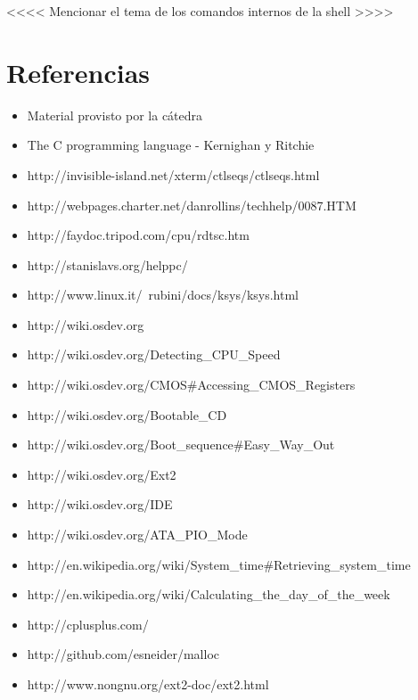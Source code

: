 \documentclass[a4paper,10pt]{article}
\begin{document}
<<<< Mencionar el tema de los comandos internos de la shell >>>>

\newpage     
\section{Referencias}

\begin{itemize}
  \item Material provisto por la cátedra
  \item The C programming language - Kernighan y Ritchie
  \item http://invisible-island.net/xterm/ctlseqs/ctlseqs.html
  \item http://webpages.charter.net/danrollins/techhelp/0087.HTM
  \item http://faydoc.tripod.com/cpu/rdtsc.htm
  \item http://stanislavs.org/helppc/
  \item http://www.linux.it/~rubini/docs/ksys/ksys.html
  \item http://wiki.osdev.org
  \item http://wiki.osdev.org/Detecting\_CPU\_Speed
  \item	http://wiki.osdev.org/CMOS\#Accessing\_CMOS\_Registers
  \item http://wiki.osdev.org/Bootable\_CD
  \item http://wiki.osdev.org/Boot\_sequence\#Easy\_Way\_Out
  \item http://wiki.osdev.org/Ext2
  \item http://wiki.osdev.org/IDE
  \item http://wiki.osdev.org/ATA\_PIO\_Mode
  \item http://en.wikipedia.org/wiki/System\_time\#Retrieving\_system\_time
  \item http://en.wikipedia.org/wiki/Calculating\_the\_day\_of\_the\_week
  \item http://cplusplus.com/
  \item http://github.com/esneider/malloc
  \item http://www.nongnu.org/ext2-doc/ext2.html
\end{itemize}
   
\end{document}
